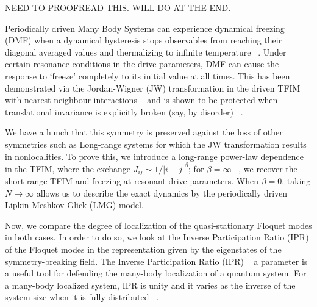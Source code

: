 \documentclass[%
reprint,
superscriptaddress,
amsmath,amssymb,
aps,
prb,
]{revtex4-2}
\begin{document}
	\maketitle
	
	
	NEED TO PROOFREAD THIS. WILL DO AT THE END.
	
	Periodically driven Many Body Systems can experience dynamical freezing (DMF) when a dynamical hysteresis stops observables from reaching their diagonal averaged values and thermalizing to infinite temperature ~\cite{bordia_periodically_2017, sahoo_periodically_2019, das_exotic_2010}. Under certain resonance conditions in the drive parameters, DMF can cause the response to ‘freeze’ completely to its initial value at all times. This has been demonstrated via the Jordan-Wigner (JW) transformation in the driven TFIM with nearest neighbour interactions ~\cite{mbeng_quantum_2020} and is shown to be protected when translational invariance is explicitly broken (say, by disorder) ~\cite{yamada_localization_2022, roy_fate_2015}. 
	
	We have a hunch that this symmetry is preserved against the loss of other symmetries such as Long-range systems for which the JW transformation results in nonlocalities. To prove this, we introduce a long-range power-law dependence in the TFIM, where the exchange $J_{ij}\sim 1/|i-j|^\beta$; for $\beta=\infty$ ~\cite{campa_statistical_2009, eisele_multiple_1988, canning_class_1992}, we recover the short-range TFIM and freezing at resonant drive parameters. When $\beta=0$, taking $N\rightarrow\infty$ allows us to describe the exact dynamics by the periodically driven Lipkin-Meshkov-Glick (LMG) model.
	
	Now, we compare the degree of localization of the quasi-stationary Floquet modes in both cases. In order to do so, we look at the Inverse Participation Ratio (IPR) of the Floquet modes in the representation given by the eigenstates of the symmetry-breaking field. The Inverse Participation Ratio (IPR) ~\cite{Misguich2016} a parameter is a useful tool for defending the many-body localization of a quantum system. For a many-body localized system, IPR is unity and it varies as the inverse of the system size when it is fully distributed ~\cite{calixto_inverse_2015}.
	
\end{document}
